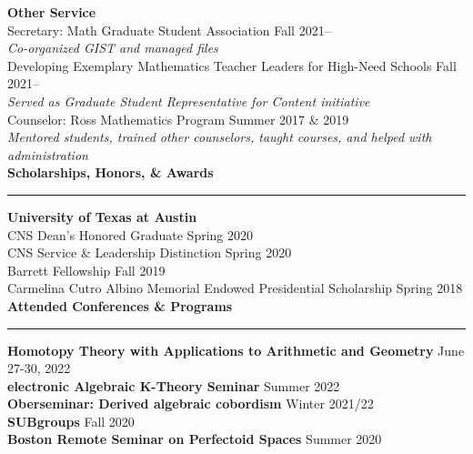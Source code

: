 \documentclass[11pt]{article}
\newenvironment{mysection}{
\color{mygreen}\bfseries\large
}
{
\\ \rule{\textwidth}{1pt}\hspace{-.25em}
} %
\begin{document}
\textbf{Other Service} \\
Secretary: Math Graduate Student Association \hfill Fall 2021-- \\
\textit{Co-organized GIST and managed files} \\
Developing Exemplary Mathematics Teacher Leaders for High-Need Schools \hfill Fall 2021--\\
\textit{Served as Graduate Student Representative for Content initiative} \\
Counselor: Ross Mathematics Program \hfill Summer 2017 \& 2019 \\
\textit{Mentored students, trained other counselors, taught courses, and helped with administration} \\

\begin{mysection}Scholarships, Honors, \& Awards\end{mysection}
\textbf{University of Texas at Austin} \\
CNS Dean's Honored Graduate \hfill Spring 2020 \\
CNS Service \& Leadership Distinction \hfill Spring 2020 \\
Barrett Fellowship \hfill Fall 2019 \\
Carmelina Cutro Albino Memorial Endowed Presidential Scholarship \hfill Spring 2018 \\

\begin{mysection}Attended Conferences \& Programs\end{mysection}
\textbf{Homotopy Theory with Applications to Arithmetic and Geometry} \hfill June 27-30, 2022 \\
\textbf{electronic Algebraic K-Theory Seminar} \hfill Summer 2022 \\
\textbf{Oberseminar: Derived algebraic cobordism} \hfill Winter 2021/22 \\
\textbf{SUBgroups} \hfill Fall 2020 \\
\textbf{Boston Remote Seminar on Perfectoid Spaces} \hfill Summer 2020 \\
\end{document}
